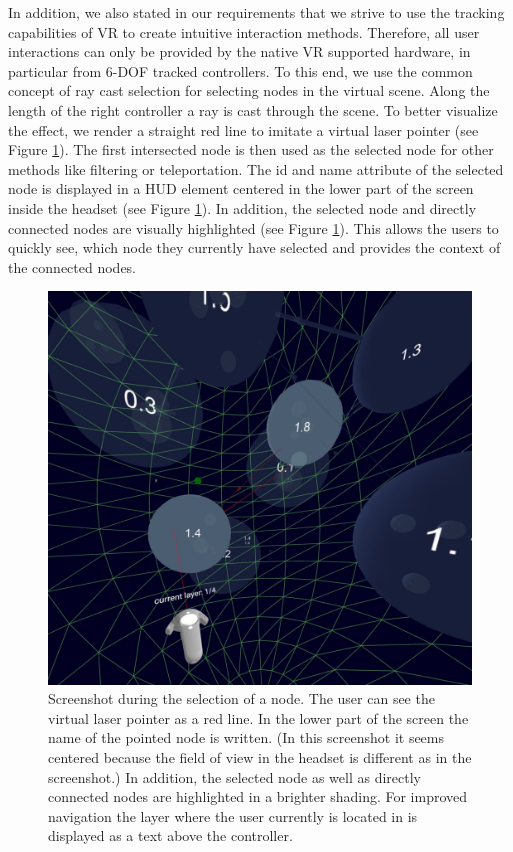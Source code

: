In addition, we also stated in our requirements that we strive to use the tracking capabilities of VR to create intuitive interaction methods.
Therefore, all user interactions can only be provided by the native VR supported hardware, in particular from 6-DOF tracked controllers. 
To this end, we use the common concept of ray cast selection for selecting nodes in the virtual scene. Along the length of the right controller a ray is cast through the scene. 
To better visualize the effect, we render a straight red line to imitate a virtual laser pointer (see Figure \ref{fig:screenshot_interaction}). 
The first intersected node is then used as the selected node for other methods like filtering or teleportation. The id and name attribute of the selected node is displayed in a HUD element centered in the lower part of the screen inside the headset (see Figure \ref{fig:screenshot_interaction}). 
In addition, the selected node and directly connected nodes are visually highlighted (see Figure \ref{fig:screenshot_interaction}). This allows the users to quickly see, which node they currently have selected and provides the context of the connected nodes.

\begin{figure}[h]
    \centering
    \includegraphics[width=1\textwidth]{graphics/screenShotFilteringNodes2.jpg}
    \caption[Screenshot during the selection of a node.]{Screenshot during the selection of a node. The user can see the virtual laser pointer as a red line. 
    In the lower part of the screen the name of the pointed node is written. (In this screenshot it seems centered because the field of view in the headset is different as in the screenshot.)    
    In addition, the selected node as well as directly connected nodes are highlighted in a brighter shading. For improved navigation the layer where the user currently is located in is displayed as a text above the controller.} 
    \label{fig:screenshot_interaction} 
\end{figure}

